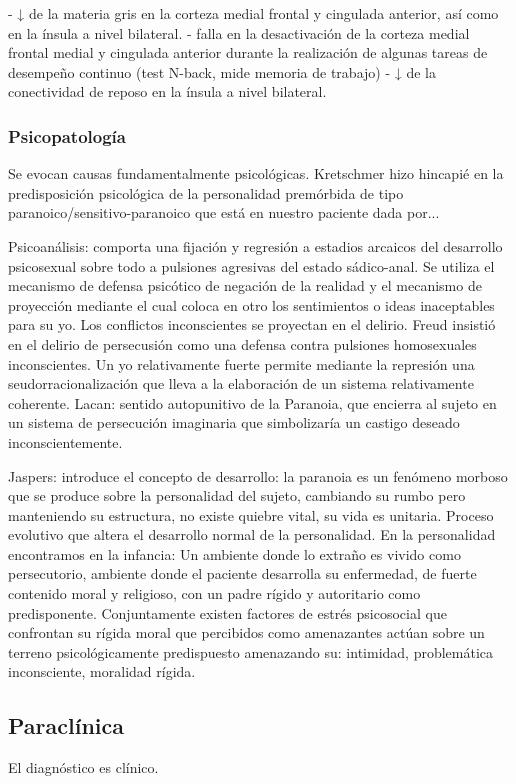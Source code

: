 - ↓ de la materia gris en la corteza medial frontal y cingulada anterior, así como en la ínsula a nivel bilateral.
- falla en la desactivación de la corteza medial frontal medial y cingulada anterior durante la realización de algunas tareas de desempeño continuo (test N-back, mide memoria de trabajo)
- ↓ de la conectividad de reposo en la ínsula a nivel bilateral.
\subsubsection*{Psicopatología}
Se evocan causas fundamentalmente psicológicas. Kretschmer hizo hincapié en la predisposición psicológica de la personalidad premórbida de tipo paranoico/sensitivo-paranoico que está en nuestro paciente dada por... 

Psicoanálisis: comporta una fijación y regresión a estadios arcaicos del desarrollo psicosexual sobre todo a pulsiones agresivas del estado sádico-anal. Se utiliza el mecanismo de defensa psicótico de negación de la realidad y el mecanismo de proyección mediante el cual coloca en otro los sentimientos o ideas inaceptables para su yo. Los conflictos inconscientes se proyectan en el delirio. Freud insistió en el delirio de persecusión como una defensa contra pulsiones homosexuales inconscientes. Un yo relativamente fuerte permite mediante la represión una seudorracionalización que lleva a la elaboración de un sistema relativamente coherente. Lacan: sentido autopunitivo de la Paranoia, que encierra al sujeto en un sistema de persecución imaginaria que simbolizaría un castigo deseado inconscientemente. 

Jaspers: introduce el concepto de desarrollo: la paranoia es un fenómeno morboso que se produce sobre la personalidad del sujeto, cambiando su rumbo pero manteniendo su estructura, no existe quiebre vital, su vida es unitaria. Proceso evolutivo que altera el desarrollo normal de la personalidad. En la personalidad encontramos en la infancia: Un ambiente donde lo extraño es vivido como persecutorio, ambiente donde el paciente desarrolla su enfermedad, de fuerte contenido moral y religioso, con un padre rígido y autoritario como predisponente. Conjuntamente existen factores de estrés psicosocial que confrontan su rígida moral que percibidos como amenazantes actúan sobre un terreno psicológicamente predispuesto amenazando su: intimidad, problemática inconsciente, moralidad rígida.
\subsection*{Paraclínica}
El diagnóstico es clínico.
